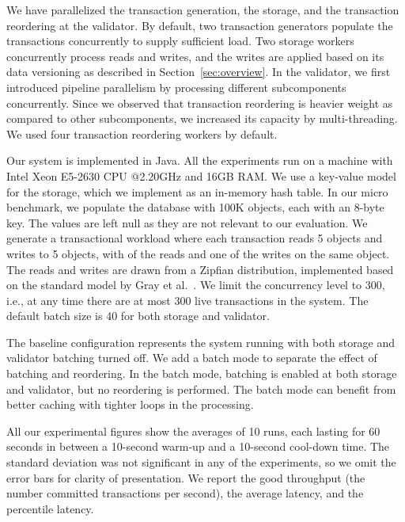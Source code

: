 We have parallelized the transaction generation, the storage, and the transaction reordering at the validator. By default, two transaction generators populate the transactions concurrently to supply sufficient load. Two storage workers concurrently process reads and writes, and the writes are applied based on its data versioning as described in Section~\ref{sec:overview}. In the validator, we first introduced pipeline parallelism by processing different subcomponents concurrently. Since we observed that transaction reordering is heavier weight as compared to other subcomponents, we increased its capacity by multi-threading. We used four transaction reordering workers by default.

Our system is implemented in Java. All the experiments run on a machine with Intel Xeon E5-2630 CPU @2.20GHz and 16GB RAM. We use a key-value model for the storage, which we implement as an in-memory hash table. In our micro benchmark, we populate the database with 100K objects, each with an 8-byte key. The values are left null as they are not relevant to our evaluation. We generate a transactional workload where each transaction reads 5 objects and writes to 5 objects, with of the reads and one of the writes on the same object. The reads and writes are drawn from a Zipfian distribution, implemented based on the standard model by Gray et al.~\cite{gray1994quickly}. We limit the concurrency level to 300, i.e., at any time there are at most 300 live transactions in the system. The default batch size is 40 for both storage and validator.

The baseline configuration represents the system running with both storage and validator batching turned off. We add a batch mode to separate the effect of batching and reordering. In the batch mode, batching is enabled at both storage and validator, but no reordering is performed. The batch mode can benefit from better caching with tighter loops in the processing. 


All our experimental figures show the averages of 10 runs, each lasting for 60 seconds in between a 10-second warm-up and a 10-second cool-down time. The standard deviation was not significant in any of the experiments, so we omit the error bars for clarity of presentation. We report the good throughput (the number committed transactions per second), the average latency, and the percentile latency.


